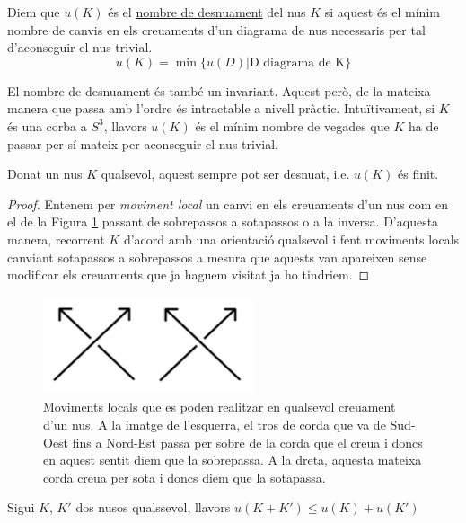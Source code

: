 \begin{definition}\label{def:desnuament}
	Diem que $u(K)$ és el \underline{nombre de desnuament} del nus $K$ si aquest és el mínim nombre de canvis en els creuaments d'un diagrama de nus necessaris per tal d'aconseguir el nus trivial. $$u(K)=\min\{u(D)|\text{D diagrama de K}\}$$
\end{definition}

El nombre de desnuament és també un invariant. Aquest però, de la mateixa manera que passa amb l'ordre és intractable a nivell pràctic. Intuïtivament, si $K$ és una corba a $S^3$, llavors $u(K)$ és el mínim nombre de vegades que $K$ ha de passar per sí mateix per aconseguir el nus trivial.

\begin{proposition}\label{prop:nombrededesnuament}
	Donat un nus $K$ qualsevol, aquest sempre pot ser desnuat, i.e. $u(K)$ és finit.
\end{proposition}

\begin{proof}
	Entenem per \textit{moviment local} un canvi en els creuaments d'un nus com en el de la Figura \ref{fig:movimentlocal} passant de sobrepassos a sotapassos o a la inversa. D'aquesta manera, recorrent $K$ d'acord amb una orientació qualsevol i fent moviments locals canviant sotapassos a sobrepassos a mesura que aquests van apareixen sense modificar els creuaments que ja haguem visitat ja ho tindriem.
\end{proof}

\begin{figure}
	\centering
	\includegraphics[width=0.6\linewidth]{img/movimentlocal.png}
	\caption{Moviments locals que es poden realitzar en qualsevol creuament d'un nus. A la imatge de l'esquerra, el tros de corda que va de  Sud-Oest fins a Nord-Est passa per sobre de la corda que el creua i doncs en aquest sentit diem que la sobrepassa. A la dreta, aquesta mateixa corda creua per sota i doncs diem que la sotapassa.}\label{fig:movimentlocal}
\end{figure}

\begin{proposition}
	Sigui $K$, $K'$ dos nusos qualssevol, llavors $u(K+K')\leq u(K)+u(K')$
\end{proposition}


